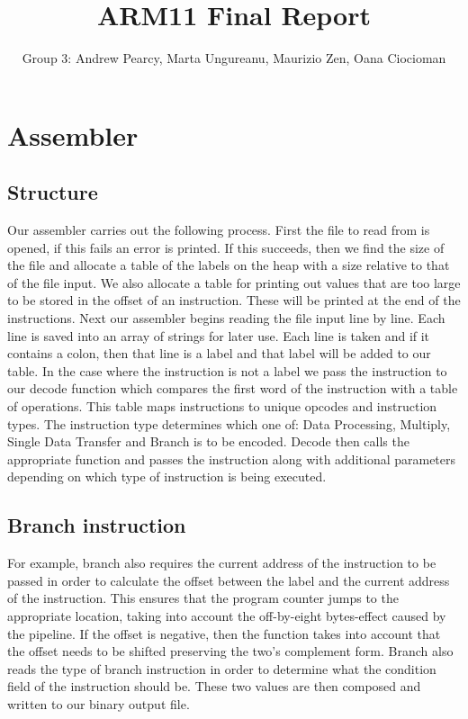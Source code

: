\documentclass[11pt]{article}
\begin{document}
\title{ARM11 Final Report}
\author{Group 3: Andrew Pearcy, Marta Ungureanu, Maurizio Zen, Oana Ciocioman}

\maketitle

\section{Assembler}
\subsection{Structure}
Our assembler carries out the following process. First the file to read from is opened, if this fails an error is printed. If this succeeds, then we find the size of the file and allocate a table of the labels on the heap with a size relative to that of the file input. We also allocate a table for printing out values that are too large to be stored in the offset of an instruction. These will be printed at the end of the instructions. Next our assembler begins reading the file input line by line.  Each line is saved into an array of strings for later use. Each line is taken and if it contains a colon, then that line is a label and that label will be added to our table. In the case where the instruction is not a label we pass the instruction to our decode function which compares the first word of the instruction with a table of operations. This table maps instructions to unique opcodes and instruction types. The instruction type determines which one of: Data Processing, Multiply, Single Data Transfer and Branch is to be encoded. Decode then calls the appropriate function and passes the instruction along with additional parameters depending on which type of instruction is being executed. \par
\subsection{Branch instruction}
For example, branch also requires the current address of the instruction to be passed in order to calculate the offset between the label and the current address of the instruction. This ensures that the program counter jumps to the appropriate location, taking into account the off-by-eight bytes-effect caused by the pipeline. If the offset is negative, then the function takes into account that the offset needs to be shifted preserving the two's complement form. Branch also reads the type of branch instruction in order to determine what the condition field of the instruction should be. These two values are then composed and written to our binary output file.\par
\end{document}
